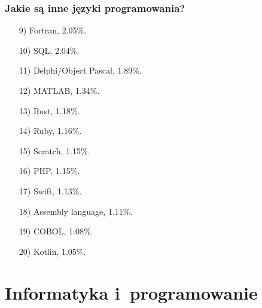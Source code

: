 \documentclass[10pt,t]{beamer}
\begin{document}
\begin{frame}
  \frametitle{Jakie są inne języki programowania?}


  \begin{itemize}

  \item[9)] Fortran, 2.05\%.

  \item[10)] SQL, 2.04\%.

  \item[11)] Delphi/Object Pascal, 1.89\%.

  \item[12)] MATLAB, 1.34\%.

  \item[13)] Rust, 1.18\%.

  \item[14)] Ruby, 1.16\%.

  \item[15)] Scratch, 1.15\%.

  \item[16)] PHP, 1.15\%.

  \item[17)] Swift, 1.13\%.

  \item[18)] Assembly language, 1.11\%.

  \item[19)] COBOL, 1.08\%.

  \item[20)] Kotlin, 1.05\%.

  \end{itemize}

\end{frame}










\section{Informatyka i~programowanie}
\end{document}
